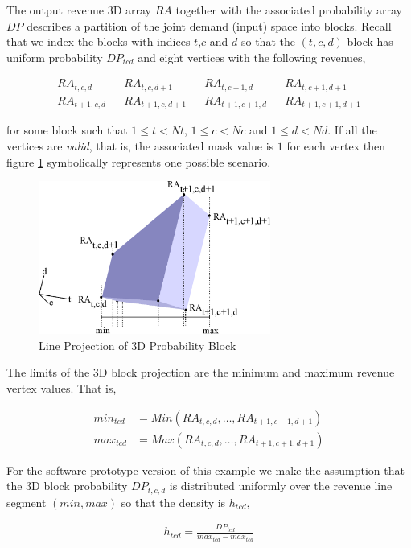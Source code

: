 The output revenue 3D array $RA$ together with the associated
probability array $DP$ describes a partition of the joint demand
(input) space into blocks. Recall that we index the blocks with
indices $t$,$c$ and $d$ so that the $(t,c,d)$ block has uniform
probability $DP_{tcd}$ and eight vertices with the following revenues,

\begin{align*}
RA_{t,c,d} && RA_{t,c,d+1} && RA_{t,c+1,d} && RA_{t,c+1,d+1}\\
RA_{t+1,c,d} && RA_{t+1,c,d+1} && RA_{t+1,c+1,d} && RA_{t+1,c+1,d+1}
\end{align*}

for some block such that $1 \le t < Nt$, $1 \le c < Nc$ and $1 \le d <
Nd$. If all the vertices are \emph{valid}, that is, the associated
mask value is $1$ for each vertex then figure
\ref{fig:block_projection} symbolically represents one possible scenario.

\begin{figure}
  \centering
  \includegraphics[width=3in]{Images/block_projection}
  \caption[Line Projection of 3D Probability Block]
          {Line Projection of 3D Probability Block}
  \label{fig:block_projection}
\end{figure}

The limits of the 3D block projection are the minimum and maximum
revenue vertex values. That is,

\begin{align*}
min_{tcd} &= Min(RA_{t,c,d}, \dots, RA_{t+1,c+1,d+1})\\
max_{tcd} &= Max(RA_{t,c,d}, \dots, RA_{t+1,c+1,d+1})
\end{align*}

For the software prototype version of this example we make the
assumption that the 3D block probability $DP_{t,c,d}$ is distributed
uniformly over the revenue line segment $(min, max)$ so that the
density is $h_{tcd}$,

\begin{align*}
h_{tcd} = \frac{DP_{tcd}}{max_{tcd} - max_{tcd}}
\end{align*}

